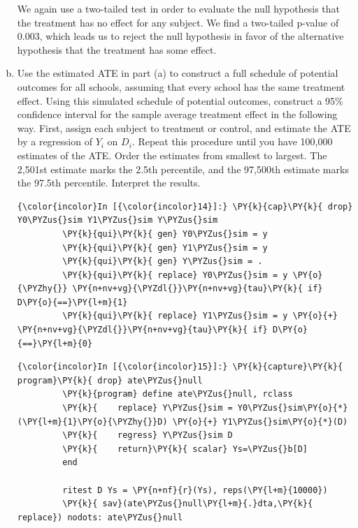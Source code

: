 \documentclass[11pt,notitlepage]{article}\usepackage[]{graphicx}\usepackage[]{color}
\makeatletter
\newenvironment{kframe}{%
 \def\at@end@of@kframe{}%
 \ifinner\ifhmode%
  \def\at@end@of@kframe{\end{minipage}}%
  \begin{minipage}{\columnwidth}%
 \fi\fi%
 \def\FrameCommand##1{\hskip\@totalleftmargin \hskip-\fboxsep
 \colorbox{shadecolor}{##1}\hskip-\fboxsep
     \hskip-\linewidth \hskip-\@totalleftmargin \hskip\columnwidth}%
 \MakeFramed {\advance\hsize-\width
   \@totalleftmargin\z@ \linewidth\hsize
   \@setminipage}}%
 {\par\unskip\endMakeFramed%
 \at@end@of@kframe}
\newenvironment{knitrout}{}{} %
\makeatother
\begin{document}
\begin{enumerate}[a)]
We again use a two-tailed test in order to evaluate the null hypothesis that the treatment has no effect for any subject.  We find a two-tailed p-value of 0.003, which leads us to reject the null hypothesis in favor of the alternative hypothesis that the treatment has some effect.

\item Use the estimated ATE in part (a) to construct a full schedule of potential outcomes for all schools, assuming that every school has the same treatment effect. Using this simulated schedule of potential outcomes, construct a 95\% confidence interval for the sample average treatment effect in the following way. First, assign each subject to treatment or control, and estimate the ATE by a regression of $Y_i$ on $D_i$. Repeat this procedure until you have 100,000 estimates of the ATE.  Order the estimates from smallest to largest. The 2,501st estimate marks the 2.5th percentile, and the 97,500th estimate marks the 97.5th percentile. Interpret the results.

\begin{knitrout}
\color{fgcolor}\begin{kframe}
    \begin{Verbatim}[commandchars=\\\{\}]
{\color{incolor}In [{\color{incolor}14}]:} \PY{k}{cap}\PY{k}{ drop} Y0\PYZus{}sim Y1\PYZus{}sim Y\PYZus{}sim
         \PY{k}{qui}\PY{k}{ gen} Y0\PYZus{}sim = y
         \PY{k}{qui}\PY{k}{ gen} Y1\PYZus{}sim = y
         \PY{k}{qui}\PY{k}{ gen} Y\PYZus{}sim = .
         \PY{k}{qui}\PY{k}{ replace} Y0\PYZus{}sim = y \PY{o}{\PYZhy{}} \PY{n+nv+vg}{\PYZdl{}}\PY{n+nv+vg}{tau}\PY{k}{ if} D\PY{o}{==}\PY{l+m}{1}
         \PY{k}{qui}\PY{k}{ replace} Y1\PYZus{}sim = y \PY{o}{+} \PY{n+nv+vg}{\PYZdl{}}\PY{n+nv+vg}{tau}\PY{k}{ if} D\PY{o}{==}\PY{l+m}{0}
\end{Verbatim}

    \begin{Verbatim}[commandchars=\\\{\}]
{\color{incolor}In [{\color{incolor}15}]:} \PY{k}{capture}\PY{k}{ program}\PY{k}{ drop} ate\PYZus{}null
         \PY{k}{program} define ate\PYZus{}null, rclass
         \PY{k}{	replace} Y\PYZus{}sim = Y0\PYZus{}sim\PY{o}{*}(\PY{l+m}{1}\PY{o}{\PYZhy{}}D) \PY{o}{+} Y1\PYZus{}sim\PY{o}{*}(D) 
         \PY{k}{	regress} Y\PYZus{}sim D 
         \PY{k}{    return}\PY{k}{ scalar} Ys=\PYZus{}b[D]	
         end
         
         ritest D Ys = \PY{n+nf}{r}(Ys), reps(\PY{l+m}{10000})
         \PY{k}{ sav}(ate\PYZus{}null\PY{l+m}{.}dta,\PY{k}{ replace}) nodots: ate\PYZus{}null
\end{Verbatim}


\end{kframe}
\end{knitrout}
\end{enumerate}
\end{document}
